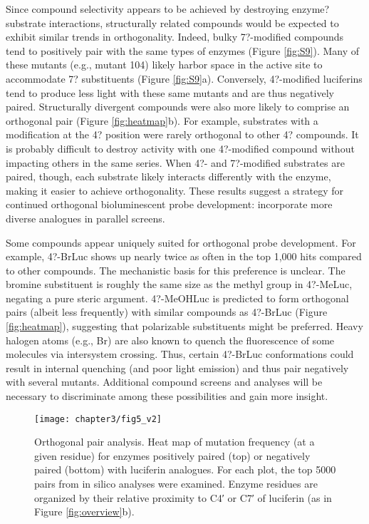 Since compound selectivity appears to be achieved by destroying enzyme?substrate interactions, structurally related compounds would be expected to exhibit similar trends in orthogonality. Indeed, bulky 7?-modified compounds tend to positively pair with the same types of enzymes (Figure \ref{fig:S9}). Many of these mutants (e.g., mutant 104) likely harbor space in the active site to accommodate 7? substituents (Figure \ref{fig:S9}a).
Conversely, 4?-modified luciferins tend to produce less light with these same mutants and are thus negatively paired. Structurally divergent compounds were also more likely to comprise an orthogonal pair (Figure \ref{fig:heatmap}b). For example, substrates with a modification at the 4? position were rarely orthogonal to other 4? compounds. It is probably difficult to destroy activity with one 4?-modified compound without impacting others in the same series. When 4?- and 7?-modified substrates are paired, though, each substrate likely interacts differently with the enzyme, making it easier to achieve orthogonality. These results suggest a strategy for continued orthogonal bioluminescent probe development: incorporate more diverse analogues in parallel screens.
\par
Some compounds appear uniquely suited for orthogonal probe development. For example, 4?-BrLuc shows up nearly twice as often in the top 1,000 hits compared to other compounds.
The mechanistic basis for this preference is unclear. The bromine substituent is roughly the same size as the methyl group in 4?-MeLuc, negating a pure steric argument. 4?-MeOHLuc is predicted to form orthogonal pairs (albeit less frequently) with similar compounds as 4?-BrLuc (Figure \ref{fig:heatmap}), suggesting that polarizable substituents might be preferred. Heavy halogen atoms (e.g., Br) are also known to quench the fluorescence of some molecules via intersystem crossing.\cite{Solovyov:2005by} Thus, certain 4?-BrLuc conformations could result in internal quenching (and poor light emission) and thus pair negatively with several mutants. Additional compound screens and analyses will be necessary to discriminate among these possibilities and gain more insight.
\par
\begin{figure}[htb]
\texttt{[image: chapter3/fig5\_v2]}
\centering
\caption[Orthogonal pair analysis]{Orthogonal pair analysis. Heat map of mutation frequency (at a given residue) for enzymes positively paired (top) or negatively paired (bottom) with luciferin analogues. For each plot, the top 5000 pairs from in silico analyses were examined. Enzyme residues are organized by their relative proximity to C4′ or C7′ of luciferin (as in Figure \ref{fig:overview}b).}
  \label{fig:willsHeatmap}
\end{figure}
